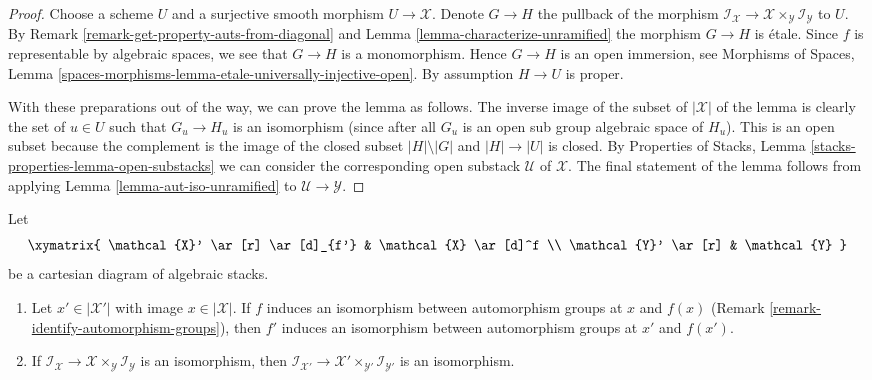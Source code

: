 \begin{proof}
Choose a scheme $U$ and a surjective smooth morphism $U \to \mathcal{X}$.
Denote $G \to H$ the pullback of the morphism
$\mathcal{I}_\mathcal{X} \to
\mathcal{X} \times_\mathcal{Y} \mathcal{I}_\mathcal{Y}$
to $U$. By Remark \ref{remark-get-property-auts-from-diagonal} and
Lemma \ref{lemma-characterize-unramified} the morphism
$G \to H$ is \'etale. Since $f$ is representable by algebraic spaces,
we see that $G \to H$ is a monomorphism. Hence $G \to H$ is an open
immersion, see
Morphisms of Spaces, Lemma
\ref{spaces-morphisms-lemma-etale-universally-injective-open}.
By assumption $H \to U$ is proper.

\medskip\noindent
With these preparations out of the way, we can prove the lemma as follows.
The inverse image of the subset of $|\mathcal{X}|$ of the lemma is
clearly the set of $u \in U$ such that $G_u \to H_u$ is an isomorphism
(since after all $G_u$ is an open sub group algebraic space of $H_u$).
This is an open subset because the complement is
the image of the closed subset $|H| \setminus |G|$ and $|H| \to |U|$
is closed. By
Properties of Stacks, Lemma \ref{stacks-properties-lemma-open-substacks}
we can consider the corresponding open substack $\mathcal{U}$ of $\mathcal{X}$.
The final statement of the lemma follows from
applying Lemma \ref{lemma-aut-iso-unramified}
to $\mathcal{U} \to \mathcal{Y}$.
\end{proof}

\begin{lemma}
\label{lemma-base-change-stabilizer-preserving}
Let
$$
\xymatrix{
\mathcal{X}' \ar[r] \ar[d]_{f'} & \mathcal{X} \ar[d]^f \\
\mathcal{Y}' \ar[r] & \mathcal{Y}
}
$$
be a cartesian diagram of algebraic stacks.
\begin{enumerate}
\item Let $x' \in |\mathcal{X}'|$ with image $x \in |\mathcal{X}|$.
If $f$ induces an isomorphism between automorphism groups at
$x$ and $f(x)$ (Remark \ref{remark-identify-automorphism-groups}), then
$f'$ induces an isomorphism between automorphism groups at $x'$ and $f(x')$.
\item If $\mathcal{I}_\mathcal{X} \to
\mathcal{X} \times_\mathcal{Y} \mathcal{I}_\mathcal{Y}$ is an isomorphism,
then $\mathcal{I}_{\mathcal{X}'} \to
\mathcal{X}' \times_{\mathcal{Y}'} \mathcal{I}_{\mathcal{Y}'}$
is an isomorphism.
\end{enumerate}
\end{lemma}

